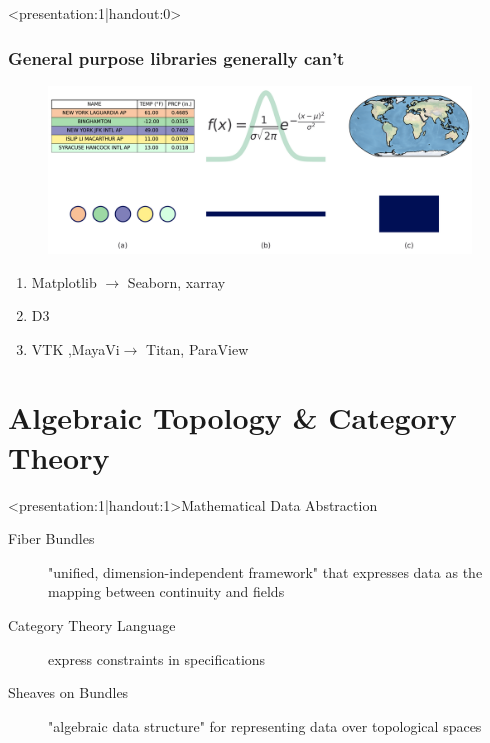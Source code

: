 \documentclass[xcolor={dvipsnames}, handout]{beamer}
\begin{document}
\begin{frame}<presentation:1|handout:0>
    \frametitle{General purpose libraries generally can't\cite{toryRethinkingVisualizationHighlevel2004}}
    \begin{figure}
        \includegraphics[height=.3\textheight]{../paper/figures/k_different_types.png}
    \end{figure}

    \begin{enumerate}
        \item Matplotlib\cite{hunterMatplotlib2DGraphics2007} $\rightarrow$ Seaborn\cite{waskom2020seaborn}, xarray \cite{hoyer2017xarray} 
        \item D3 \cite{bostockDataDrivenDocuments2011}
        \item VTK \cite{hanwellVisualizationToolkitVTK2015,geveciVTK2012},MayaVi\cite{RamachandranMayaVI2011}$\rightarrow$ Titan\cite{brianwylieUnifiedToolkitInformation2009}, ParaView\cite{ahrens2005paraview}
    \end{enumerate}
\end{frame}

\section{Algebraic Topology & Category Theory}
\begin{frame}<presentation:1|handout:1>{Mathematical Data Abstraction}
    \begin{description}
        \item[Fiber Bundles] "unified, dimension-independent framework" that expresses data as the mapping between continuity and fields \cite{butlerVectorBundleClassesForm1992,butlerVisualizationModelBased1989}
        \item[Category Theory Language] express constraints in specifications \cite{wielsManagementEvolvingSpecifications1998}   
        \item[Sheaves on Bundles] "algebraic data structure" for representing data over topological spaces \cite{ghristElementaryAppliedTopology2014}
    \end{description}
\end{frame}
\end{document}

